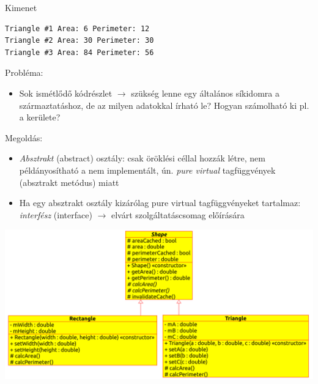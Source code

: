 \begin{frame}[fragile]
    \begin{exampleblock}{}
        \vspace{-.2cm}
        \fontsize{8}{9} \selectfont
        
        \vspace{-.2cm}
    \end{exampleblock}
    \begin{block}{Kimenet}
        \vspace{-.4cm}
        \fontsize{8}{9} \selectfont
        \begin{verbatim}
Triangle #1 Area: 6 Perimeter: 12
Triangle #2 Area: 30 Perimeter: 30
Triangle #3 Area: 84 Perimeter: 56
        \end{verbatim}
        \vspace{-.6cm}
    \end{block}
\end{frame}

\begin{frame}
    Probléma:
    \begin{itemize}
        \item Sok ismétlődő kódrészlet $\to$ szükség lenne egy általános síkidomra a származtatáshoz, de az milyen adatokkal írható le? Hogyan számolható ki pl. a kerülete?
    \end{itemize}
    Megoldás:
    \begin{itemize}
        \item \emph{Absztrakt} (abstract) osztály: csak öröklési céllal hozzák létre, nem példányosítható a nem implementált, ún. \emph{pure virtual} tagfüggvények (absztrakt metódus) miatt
        \item Ha egy absztrakt osztály kizárólag pure virtual tagfüggvényeket tartalmaz: \emph{interfész} (interface) $\to$ elvárt szolgáltatáscsomag előírására
    \end{itemize}
\end{frame}

\begin{frame}
    \begin{center}
        \includegraphics[scale=0.6]{Shape15.eps} \\
      \end{center}
\end{frame}

